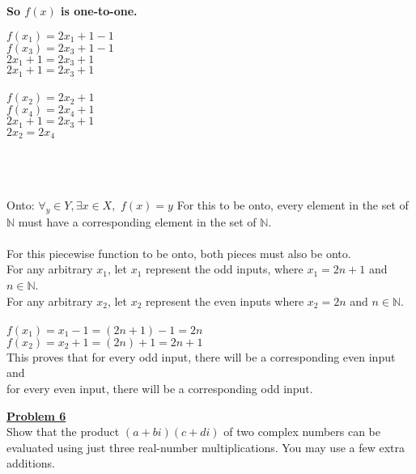 \documentclass[11pt]{article}
\begin{document}
\begin{enumerate}
\begin{minipage}{0.5\textwidth}
			\textbf{So $f(x)$ is one-to-one.}\\
			\end{minipage}
			\begin{minipage}{0.5\textwidth}
				 $f(x_1) = 2x_1+1-1$\\
				$f(x_3) = 2x_3+1-1$\\
				$2x_1+1 = 2x_3+1$\\
				$2x_1+1 = 2x_3+1$\\\\

				$f(x_2) = 2x_2+1$\\
				$f(x_4) = 2x_4+1$\\
				$2x_1+1 = 2x_3+1$\\
				$2x_2 = 2x_4$\\\\
			\end{minipage}\\\\

			Onto: $\forall_{y} \in Y, \exists x \in X,$ $f(x) = y$
				For this to be onto, every element in the set of $\mathbb{N}$ must have a corresponding element in the set of $\mathbb{N}$. \\\\
				For this piecewise function to be onto, both pieces must also be onto. \\
				For any arbitrary $x_1$, let $x_1$ represent the odd inputs, where $x_1 = 2n+1$ and $n \in \mathbb{N}$.\\
				For any arbitrary $x_2$, let $x_2$ represent the even inputs where $x_2 = 2n$ and $n \in \mathbb{N}$.\\\\

				$f(x_1) = x_1 - 1 = (2n+1)-1 = 2n$ \\
				$f(x_2) = x_2 +1 = (2n) + 1 = 2n+1$ \\

				This proves that for every odd input, there will be a corresponding even input and\\
				for every even input, there will be a corresponding odd input. 
	\end{enumerate}

\noindent\textbf{\underline{Problem 6}}\\
	Show that the product $(a+bi)(c+di)$ of two complex numbers can be evaluated using just three real-number multiplications. You may use a few extra additions. 
\end{document}
